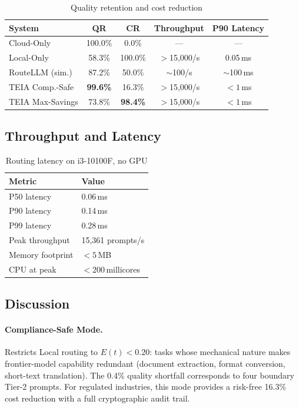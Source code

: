 \documentclass[11pt,a4paper]{article}
\newcommand{\teia}{\textsc{TEIA}}
\begin{document}
\begin{table}[h]
\centering
\caption{Quality retention and cost reduction}
\label{tab:results}
\begin{tabular}{@{}lcccc@{}}
\toprule
System & QR & CR & Throughput & P90 Latency \\
\midrule
Cloud-Only              & 100.0\%         & 0.0\%           & ---            & ---        \\
Local-Only              & 58.3\%          & 100.0\%         & $>$15{,}000/s  & 0.05\,ms   \\
RouteLLM (sim.)         & 87.2\%          & 50.0\%          & $\sim$100/s    & $\sim$100\,ms \\
\teia{} Comp.-Safe      & \textbf{99.6\%} & 16.3\%          & $>$15{,}000/s  & $<1$\,ms   \\
\teia{} Max-Savings     & 73.8\%          & \textbf{98.4\%} & $>$15{,}000/s  & $<1$\,ms   \\
\bottomrule
\end{tabular}
\end{table}

\subsection{Throughput and Latency}

\begin{table}[h]
\centering
\caption{Routing latency on i3-10100F, no GPU}
\label{tab:latency}
\begin{tabular}{@{}ll@{}}
\toprule
Metric & Value \\
\midrule
P50 latency          & 0.06\,ms \\
P90 latency          & 0.14\,ms \\
P99 latency          & 0.28\,ms \\
Peak throughput      & 15{,}361 prompts/s \\
Memory footprint     & $<5$\,MB \\
CPU at peak          & $<200$\,millicores \\
\bottomrule
\end{tabular}
\end{table}

\subsection{Discussion}

\paragraph{Compliance-Safe Mode.}
Restricts Local routing to $E(t) < 0.20$: tasks whose mechanical nature makes
frontier-model capability redundant (document extraction, format conversion,
short-text translation). The 0.4\% quality shortfall corresponds to four boundary
Tier-2 prompts. For regulated industries, this mode provides a risk-free 16.3\%
cost reduction with a full cryptographic audit trail.
\end{document}
